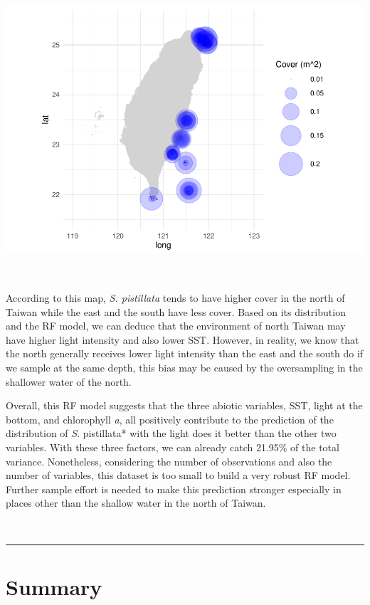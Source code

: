 \documentclass[
]{article}
\begin{document}
\includegraphics{index_files/figure-latex/unnamed-chunk-13-1.pdf}

~

According to this map, \emph{S. pistillata} tends to have higher cover
in the north of Taiwan while the east and the south have less cover.
Based on its distribution and the RF model, we can deduce that the
environment of north Taiwan may have higher light intensity and also
lower SST. However, in reality, we know that the north generally
receives lower light intensity than the east and the south do if we
sample at the same depth, this bias may be caused by the oversampling in
the shallower water of the north.

Overall, this RF model suggests that the three abiotic variables, SST,
light at the bottom, and chlorophyll \emph{a}, all positively contribute
to the prediction of the distribution of \emph{S}. pistillata* with the
light does it better than the other two variables. With these three
factors, we can already catch 21.95\% of the total variance.
Nonetheless, considering the number of observations and also the number
of variables, this dataset is too small to build a very robust RF model.
Further sample effort is needed to make this prediction stronger
especially in places other than the shallow water in the north of
Taiwan.

~

\begin{center}\rule{0.5\linewidth}{0.5pt}\end{center}

\hypertarget{summary}{%
\section{Summary}\label{summary}}
\end{document}
